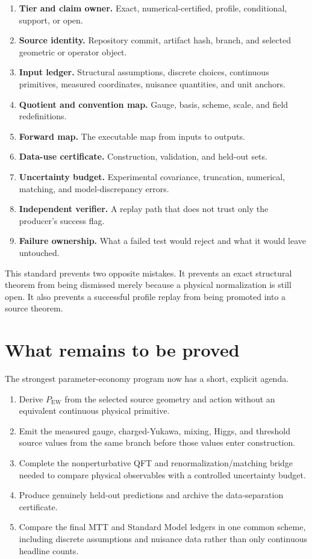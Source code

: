 \documentclass[11pt]{article}
\newcommand{\PEW}{P_{\mathrm{EW}}}
\begin{document}
\begin{enumerate}
\item \textbf{Tier and claim owner.} Exact, numerical-certified, profile,
conditional, support, or open.
\item \textbf{Source identity.} Repository commit, artifact hash, branch, and
selected geometric or operator object.
\item \textbf{Input ledger.} Structural assumptions, discrete choices,
continuous primitives, measured coordinates, nuisance quantities, and unit
anchors.
\item \textbf{Quotient and convention map.} Gauge, basis, scheme, scale, and
field redefinitions.
\item \textbf{Forward map.} The executable map from inputs to outputs.
\item \textbf{Data-use certificate.} Construction, validation, and held-out
sets.
\item \textbf{Uncertainty budget.} Experimental covariance, truncation,
numerical, matching, and model-discrepancy errors.
\item \textbf{Independent verifier.} A replay path that does not trust only
the producer's success flag.
\item \textbf{Failure ownership.} What a failed test would reject and what it
would leave untouched.
\end{enumerate}

This standard prevents two opposite mistakes. It prevents an exact
structural theorem from being dismissed merely because a physical
normalization is still open. It also prevents a successful profile replay
from being promoted into a source theorem.

\section{What remains to be proved}

The strongest parameter-economy program now has a short, explicit agenda.

\begin{enumerate}
\item Derive \(\PEW\) from the selected source geometry and action
without an equivalent continuous physical primitive.
\item Emit the measured gauge, charged-Yukawa, mixing, Higgs, and threshold
source values from the same branch before those values enter construction.
\item Complete the nonperturbative QFT and renormalization/matching bridge
needed to compare physical observables with a controlled uncertainty budget.
\item Produce genuinely held-out predictions and archive the data-separation
certificate.
\item Compare the final MTT and Standard Model ledgers in one common scheme,
including discrete assumptions and nuisance data rather than only continuous
headline counts.
\end{enumerate}
\end{document}
